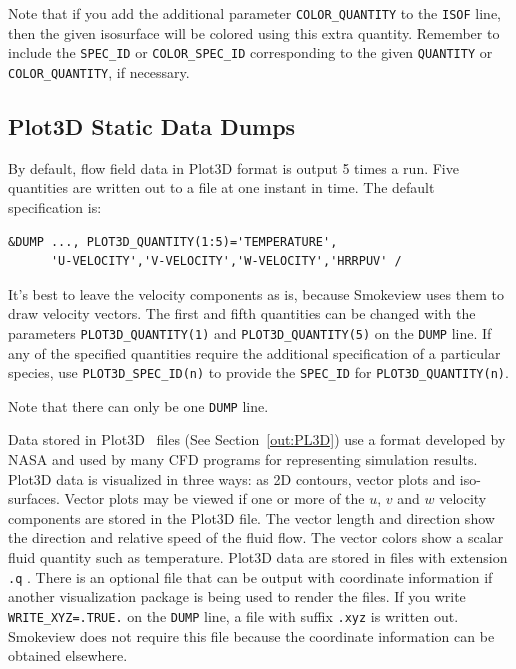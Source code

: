 \documentclass[11pt]{book}
\newcommand{\ct}{\tt\small}
\begin{document}
Note that if you add the additional parameter {\ct COLOR\_QUANTITY} to the {\ct ISOF} line, then the given isosurface will be colored using
this extra quantity. Remember to include the {\ct SPEC\_ID} or {\ct COLOR\_SPEC\_ID} corresponding to the given {\ct QUANTITY} or
{\ct COLOR\_QUANTITY}, if necessary.




\subsection{Plot3D Static Data Dumps}
\label{info:PL3D}

By default, flow field data in Plot3D format is output 5 times a run.
Five quantities are written out to a file at one instant in time. The default specification is:

\footnotesize
\begin{verbatim}
&DUMP ..., PLOT3D_QUANTITY(1:5)='TEMPERATURE',
      'U-VELOCITY','V-VELOCITY','W-VELOCITY','HRRPUV' /
\end{verbatim}
\normalsize

\noindent
It's best to leave the velocity components as is, because Smokeview
uses them to draw velocity vectors. The first and fifth quantities can
be changed with the parameters {\ct PLOT3D\_QUANTITY(1)} and {\ct PLOT3D\_QUANTITY(5)}
on the {\ct DUMP} line. If any of the specified quantities require the additional specification of a particular species,
use {\ct PLOT3D\_SPEC\_ID(n)} to provide the {\ct SPEC\_ID} for {\ct PLOT3D\_QUANTITY(n)}.

\begin{warning}
Note that there can only be one {\ct DUMP} line.
\end{warning}

Data stored in Plot3D~\cite{PLOT3D} files (See Section~\ref{out:PL3D}) use a format developed by
NASA and used by many CFD programs for representing simulation results.
Plot3D data is visualized in three ways: as 2D contours, vector plots and iso-surfaces.
Vector plots may be viewed if one or more of the $u$, $v$ and $w$
velocity components are stored in the Plot3D file. The vector
length and direction show the direction and relative speed of the
fluid flow. The vector colors show a scalar fluid quantity such as
temperature.
Plot3D data are stored in files with extension {\ct .q} . There is
an optional file that can be output with coordinate information
if another visualization package is being used to render the
files. If you write {\ct WRITE\_XYZ=.TRUE.} on the {\ct DUMP}
line, a file with suffix {\ct .xyz} is written out. Smokeview
does not require this file because the coordinate information can be
obtained elsewhere.
\end{document}
